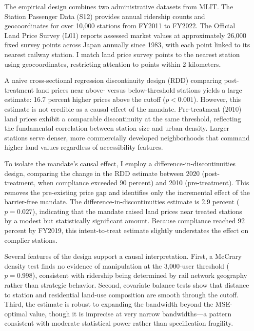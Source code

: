\documentclass[12pt]{article}
\begin{document}
The empirical design combines two administrative datasets from MLIT. The Station Passenger Data (S12) provides annual ridership counts and geocoordinates for over 10,000 stations from FY2011 to FY2022. The Official Land Price Survey (L01) reports assessed market values at approximately 26,000 fixed survey points across Japan annually since 1983, with each point linked to its nearest railway station. I match land price survey points to the nearest station using geocoordinates, restricting attention to points within 2 kilometers.

A naive cross-sectional regression discontinuity design (RDD) comparing post-treatment land prices near above- versus below-threshold stations yields a large estimate: 16.7 percent higher prices above the cutoff ($p < 0.001$). However, this estimate is not credible as a causal effect of the mandate. Pre-treatment (2010) land prices exhibit a comparable discontinuity at the same threshold, reflecting the fundamental correlation between station size and urban density. Larger stations serve denser, more commercially developed neighborhoods that command higher land values regardless of accessibility features.

To isolate the mandate's causal effect, I employ a difference-in-discontinuities design, comparing the change in the RDD estimate between 2020 (post-treatment, when compliance exceeded 90 percent) and 2010 (pre-treatment). This removes the pre-existing price gap and identifies only the incremental effect of the barrier-free mandate. The difference-in-discontinuities estimate is 2.9 percent ($p = 0.027$), indicating that the mandate raised land prices near treated stations by a modest but statistically significant amount. Because compliance reached 92 percent by FY2019, this intent-to-treat estimate slightly understates the effect on complier stations.

Several features of the design support a causal interpretation. First, a McCrary density test finds no evidence of manipulation at the 3,000-user threshold ($p = 0.998$), consistent with ridership being determined by rail network geography rather than strategic behavior. Second, covariate balance tests show that distance to station and residential land-use composition are smooth through the cutoff. Third, the estimate is robust to expanding the bandwidth beyond the MSE-optimal value, though it is imprecise at very narrow bandwidths---a pattern consistent with moderate statistical power rather than specification fragility.
\end{document}
